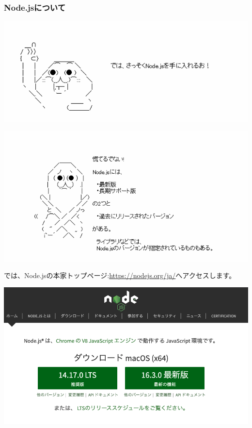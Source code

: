 \subsubsection*{Node.jsについて}
\keeplastskip{
  \label{sec:1-1-1-2}
  \par\nobreak
}
\begin{reviewimage}%
\includegraphics[width=1.0\maxwidth]{./images/01-createDevEnv/y01_getNodejs.png}%
\label{image:01-createDevEnv:y01_getNodejs}
\end{reviewimage}
\begin{reviewimage}%
\includegraphics[width=1.0\maxwidth]{./images/01-createDevEnv/yr01_aboutNodejs.png}%
\label{image:01-createDevEnv:yr01_aboutNodejs}
\end{reviewimage}

では、Node.jsの本家トップページ:\url{https://nodejs.org/ja/}へアクセスします。

\begin{reviewimage}[H]%
\includegraphics[width=1.0\maxwidth]{./images/01-createDevEnv/01_01nodejsTop.png}%
\label{image:01-createDevEnv:01_01nodejsTop}
\end{reviewimage}

